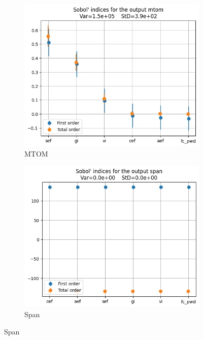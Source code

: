 \documentclass[a4paper, 11pt]{article}
\begin{document}
\begin{figure}[H]
    \centering
    \begin{subfigure}[b]{0.45\textwidth}
        \includegraphics[width=\textwidth]{Images_Ayoub/Problem2/UseCase2/Sobol_Indices/mtom.png}
        \caption{MTOM}
        \label{fig:mtom}
    \end{subfigure}
    \hfill
    \begin{subfigure}[b]{0.45\textwidth}
        \includegraphics[width=\textwidth]{Images_Ayoub/Problem2/UseCase2/Sobol_Indices/span.png}
        \caption{Span}
        \label{fig:span}
    \end{subfigure}


\end{figure}
\end{document}
